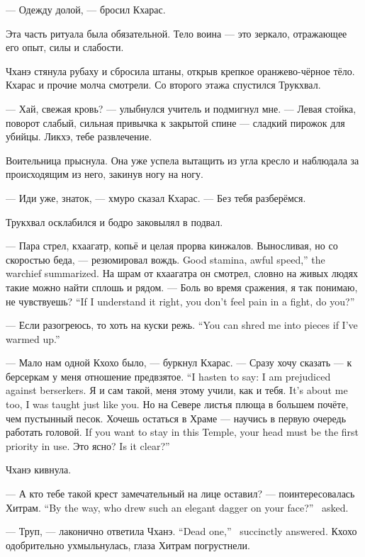 --- Одежду долой, --- бросил Кхарас.

Эта часть ритуала была обязательной.
Тело воина --- это зеркало, отражающее его опыт, силы и слабости.

Чханэ стянула рубаху и сбросила штаны, открыв крепкое оранжево-чёрное тёло.
Кхарас и прочие молча смотрели.
Со второго этажа спустился Трукхвал.

--- Хай, свежая кровь? --- улыбнулся учитель и подмигнул мне.
--- Левая стойка, поворот слабый, сильная привычка к закрытой спине --- сладкий пирожок для убийцы.
Ликхэ, тебе развлечение.

Воительница прыснула.
Она уже успела вытащить из угла кресло и наблюдала за происходящим из него, закинув ногу на ногу.

--- Иди уже, знаток, --- хмуро сказал Кхарас.
--- Без тебя разберёмся.

Трукхвал осклабился и бодро заковылял в подвал.

--- Пара стрел, кхаагатр, копьё и целая прорва кинжалов.
{Выносливая, но со скоростью беда, --- резюмировал вождь.}
{Good stamina, awful speed,'' the warchief summarized.}
На шрам от кхаагатра он смотрел, словно на живых людях такие можно найти сплошь и рядом.
{--- Боль во время сражения, я так понимаю, не чувствуешь?}
{``If I understand it right, you don't feel pain in a fight, do you?''}

{--- Если разогреюсь, то хоть на куски режь.}
{``You can shred me into pieces if I've warmed up.''}

--- Мало нам одной Кхохо было, --- буркнул Кхарас.
{--- Сразу хочу сказать --- к берсеркам у меня отношение предвзятое.}
{``I hasten to say: I am prejudiced against berserkers.}
{Я и сам такой, меня этому учили, как и тебя.}
{It's about me too, I was taught just like you.}
Но на Севере листья плюща в большем почёте, чем пустынный песок.
{Хочешь остаться в Храме --- научись в первую очередь работать головой.}
{If you want to stay in this Temple, your head must be the first priority in use.}
{Это ясно?}
{Is it clear?''}

Чханэ кивнула.

{--- А кто тебе такой крест замечательный на лице оставил? --- поинтересовалась Хитрам.}
{``By the way, who drew such an elegant dagger on your face?'' \Chitram\ asked.}

{--- Труп, --- лаконично ответила Чханэ.}
{``Dead one,'' \Chhanei\ succinctly answered.}
Кхохо одобрительно ухмыльнулась, глаза Хитрам погрустнели.

